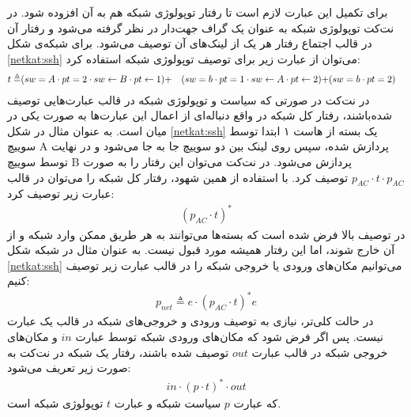برای تکمیل این عبارت لازم است تا رفتار توپولوژی شبکه‌ هم به آن افزوده شود.
در نت‌کت توپولوژی شبکه به عنوان یک گراف جهت‌دار در نظر گرفته می‌شود و رفتار آن در قالب اجتماع رفتار هر یک از لینک‌های آن توصیف می‌شود.
برای شبکه‌ی شکل
\ref{netkat:ssh}
می‌توان از عبارت زیر برای توصیف توپولوژی شبکه استفاده کرد:
\begin{align*}
    t \triangleq & (sw = A \cdot pt = 2 \cdot sw \leftarrow B \cdot pt \leftarrow 1) +
                 & (sw = b \cdot pt = 1 \cdot sw \leftarrow A \cdot pt \leftarrow 2) +
                 & (sw = b \cdot pt = 2)
\end{align*}
در نت‌کت در صورتی که سیاست و توپولوژی شبکه در قالب عبارت‌هایی توصیف شده‌باشند،
رفتار کل شبکه در واقع دنباله‌ای از اعمال این عبارت‌ها به صورت یکی در میان است.
به عنوان مثال در شکل
\ref{netkat:ssh}
یک بسته از هاست ۱ ابتدا توسط سوییچ
A
پردازش شده، سپس روی لینک بین دو سوییچ جا به جا می‌شود و در نهایت توسط سوییچ
B
پردازش می‌شود.
در نت‌کت می‌توان این رفتار را به صورت
$p_{AC}\cdot t \cdot p_{AC}$
توصیف کرد.
با استفاده از همین شهود، رفتار کل شبکه را می‌توان در قالب عبارت زیر توصیف کرد:
\begin{align*}
    (p_{AC}\cdot t)^*
\end{align*}
در توصیف بالا فرض شده است که بسته‌ها می‌توانند به هر طریق ممکن وارد شبکه و از آن خارج شوند، اما این رفتار همیشه مورد قبول نیست.
به عنوان مثال در شبکه شکل
\ref{netkat:ssh}
می‌توانیم مکان‌های ورودی یا خروجی شبکه را در قالب عبارت زیر توصیف کنیم:
\begin{align*}
    p_{net} \triangleq e \cdot (p_{AC}\cdot t)^* e
\end{align*}
در حالت کلی‌تر، نیازی به توصیف ورودی و خروجی‌های شبکه در قالب یک عبارت نیست.
پس اگر فرض شود که مکان‌های ورودی شبکه توسط عبارت
$in$
و مکان‌های خروجی شبکه در قالب عبارت
$out$
توصیف شده‌ باشند، رفتار یک شبکه در نت‌کت به صورت زیر تعریف می‌شود:
\begin{align*}
    in \cdot (p\cdot t)^*\cdot out
\end{align*}
که عبارت
$p$
سیاست شبکه و عبارت
$t$
توپولوژی شبکه است.

